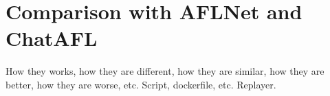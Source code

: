 \chapter{Comparison with AFLNet and ChatAFL}
How they works, how they are different, how they are similar, how they are better, how they are worse, etc.
Script, dockerfile, etc.
Replayer.

